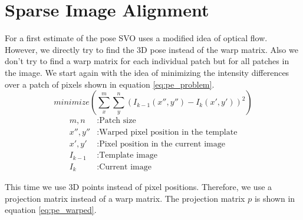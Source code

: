 \documentclass[11pt,a4paper,titlepage,oneside]{report}
\begin{document}
\section{Sparse Image Alignment}\label{sec:pose_estimation}
For a first estimate of the pose SVO uses a modified idea of optical flow. However, we directly try to find the 3D pose instead of the warp matrix. Also we don't try to find a warp matrix for each individual patch but for all patches in the image. We start again with the idea of minimizing the intensity differences over a patch of pixels shown in equation \ref{eq:pe_problem}.
\begin{equation}\label{eq:pe_problem}
	minimize(\sum_x^m\sum_y^n(I_{k-1}(x'',y'')-I_{k}(x',y'))^2)
\end{equation}
\begin{align*}
	m,n				 &: \text{Patch size}\\
  x'',y''    &: \text{Warped pixel position in the template}\\
  x',y'      &: \text{Pixel position in the current image}\\
  I_{k-1}    &: \text{Template image}\\
  I_{k}      &: \text{Current image}
\end{align*}

This time we use 3D points instead of pixel positions. Therefore, we use a projection matrix instead of a warp matrix. The projection matrix $p$ is shown in equation \ref{eq:pe_warped}. 
\end{document}
